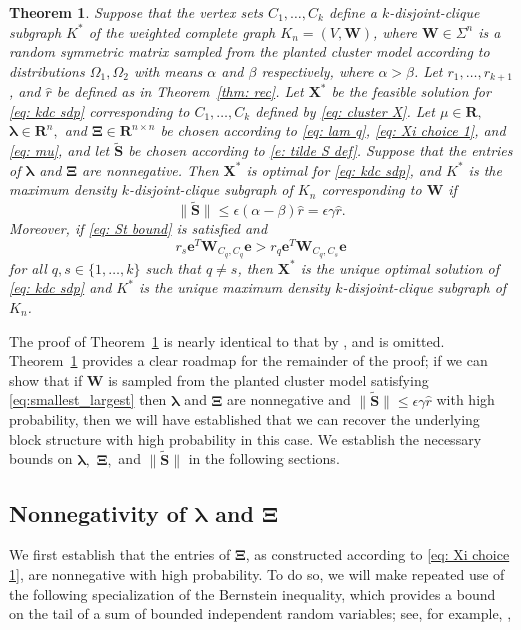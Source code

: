 \documentclass[twoside,11pt]{article}
\newtheorem{theorem}{Theorem}[section]
\newcommand{\R}{\mathbf{R}}
\newcommand{\St}{\bs{\tilde S}}
\newcommand{\e}{\bs {e}}
\newcommand{\bs}{\boldsymbol}
\newcommand{\X}{\bs {X}}
\newcommand{\W}{\bs {W}}
\newcommand{\0}{\bs{0}}
\begin{document}
{\begin{theorem} \label{T: S opt conds}
	Suppose that the vertex sets $C_1, \dots, C_k$ define a $k$-disjoint-clique subgraph $K^*$ of 
	the weighted complete graph $K_n = (V, \W)$, where
	$\W \in \Sigma^n$ is a random symmetric matrix sampled from the planted cluster model
	according to distributions  $\Omega_1, \Omega_2$ with means $\alpha$ and $\beta$ respectively, 
	where $\alpha > \beta$.
	Let $r_1, \dots, r_{k+1}$, and  $\hat r$ be defined as in Theorem~\ref{thm: rec}.
	Let $\X^*$ be the feasible solution for \eqref{eq: kdc sdp} corresponding to $C_1, \dots, C_k$ defined
	by \eqref{eq: cluster X}. Let $\mu \in \R,$ $\bs\lambda \in \R^n,$  and $\bs\Xi \in \R^{n\times n}$
	be chosen according to \eqref{eq: lam q},  \eqref{eq: Xi choice 1}, 
	and \eqref{eq: mu},
	and let $\St$ be chosen according to \eqref{e: tilde S def}.	
	Suppose that the entries of  $\bs\lambda$ and  $\bs\Xi$ are nonnegative.
	Then
	$\X^*$ is optimal for \eqref{eq: kdc sdp}, and $K^*$  is the maximum density 
	$k$-disjoint-clique
	subgraph of $K_n$ corresponding to $\W$ if
	\begin{equation} \label{eq: St bound}
	\| \St\| \le \epsilon (\alpha-\beta) \hat r = \epsilon \gamma \hat r .
	\end{equation}
	Moreover, if \eqref{eq: St bound} is satisfied and
	\begin{equation} \label{a: block weights}
	r_s \e^T \W_{C_q, C_q} \e > r_q \e^T \W_{C_q, C_s} \e
	\end{equation}
	for all $q, s \in \{1,\dots,k\}$ such that $q\neq s$,
	then $\X^*$ is the unique optimal solution of \eqref{eq: kdc sdp} and
	$K^*$ is the unique maximum density $k$-disjoint-clique
	subgraph of $K_n$.
\end{theorem}

The proof of Theorem~\ref{T: S opt conds} is nearly identical to that by \citet[Theorem~4.2]{ames2014guaranteed}, and is
omitted.
Theorem~\ref{T: S opt conds} provides a clear roadmap for the remainder of the proof; if we can show that if \(\W\) is sampled from the planted cluster
model satisfying \eqref{eq:smallest_largest} then \(\bs \lambda\)
and \(\bs \Xi\) are nonnegative and \(\|\St\| \le \epsilon \gamma \hat r\) with high probability, then we will have established that we can recover the underlying block
structure with high probability in this case. We establish the necessary bounds on \(\bs \lambda,\) \(\bs \Xi,\) and \(\|\St\|\)
in the following sections.

\subsection{Nonnegativity of \(\bs\lambda\) and \(\bs\Xi\)}
\label{sec: nonneg}
We first establish that the entries of \(\bs \Xi\), as constructed according to \eqref{eq: Xi choice 1},
are nonnegative with high probability.
To do so, we will make repeated use of the following specialization of the 
Bernstein inequality,
which provides a  bound on the tail of a sum of bounded independent random variables;
see, for example,
\cite[Theorem~6]{lugosi2009},

}
\end{document}
